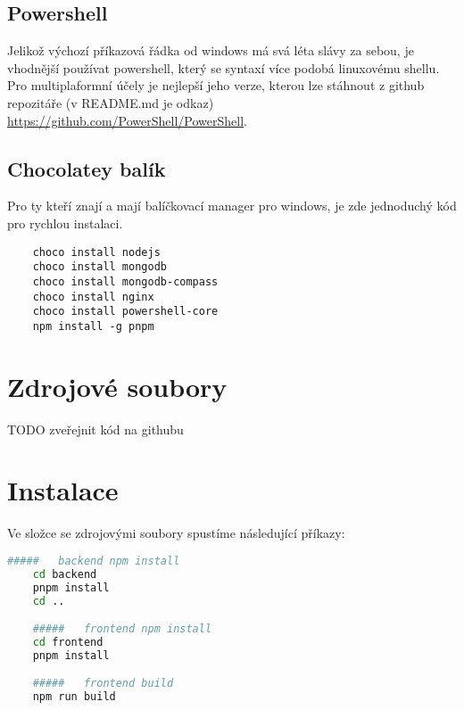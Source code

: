 \subsection{Powershell}
Jelikož výchozí příkazová řádka od windows má svá léta slávy za sebou, je
vhodnější používat powershell, který se syntaxí více podobá linuxovému shellu.
Pro multiplaformní účely je nejlepší jeho  verze, kterou lze stáhnout
z github repozitáře (v README.md je odkaz) \url{https://github.com/PowerShell/PowerShell}.

\subsection{Chocolatey balík}
Pro ty kteří znají a mají balíčkovací manager  pro windows, je zde
jednoduchý kód pro rychlou instalaci.
\begin{lstlisting}
	choco install nodejs
	choco install mongodb
	choco install mongodb-compass
	choco install nginx
	choco install powershell-core
	npm install -g pnpm
\end{lstlisting}

\section{Zdrojové soubory}
TODO zveřejnit kód na githubu

\section{Instalace}
Ve složce se zdrojovými soubory spustíme následující příkazy:
\begin{lstlisting}[language=bash]
	#####   backend npm install
	cd backend
	pnpm install
	cd ..

	#####   frontend npm install
	cd frontend
	pnpm install

	#####   frontend build
	npm run build
\end{lstlisting}

